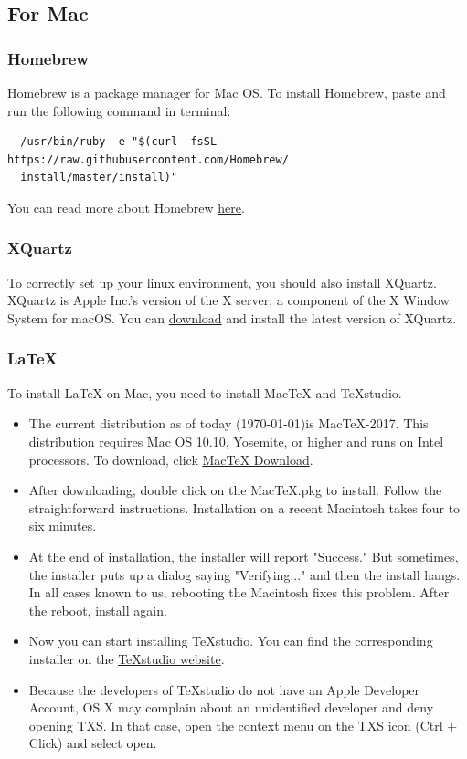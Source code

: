 \documentclass[10pt]{article} %
\begin{document}
\subsection{For Mac}

\subsubsection{Homebrew}

Homebrew is a package manager for Mac OS.
To install Homebrew, paste and run the following command in terminal:
\begin{lstlisting}
  /usr/bin/ruby -e "$(curl -fsSL https://raw.githubusercontent.com/Homebrew/
  install/master/install)"
\end{lstlisting}
You can read more about Homebrew \href{https://brew.sh/}{here}.

\subsubsection{XQuartz}

To correctly set up your linux environment, you should also install XQuartz.
XQuartz is Apple Inc.'s version of the X server, a component of the X Window System for macOS.
You can \href{https://www.xquartz.org/}{download} and install the latest version of XQuartz.

\subsubsection{LaTeX}

To install LaTeX on Mac, you need to install MacTeX and TeXstudio.
\begin{itemize}
  \item The current distribution as of today (\today)is MacTeX-2017.
  This distribution requires Mac OS 10.10, Yosemite, or higher and runs on Intel processors.
  To download, click \href{http://www.tug.org/mactex/mactex-download.html}{MacTeX Download}.
  \item After downloading, double click on the MacTeX.pkg to install.
  Follow the straightforward instructions.
  Installation on a recent Macintosh takes four to six minutes.
  \item At the end of installation, the installer will report "Success." But sometimes, the installer puts up a dialog saying "Verifying..." and then the install hangs.
  In all cases known to us, rebooting the Macintosh fixes this problem.
  After the reboot, install again.
  \item Now you can start installing TeXstudio.
  You can find the corresponding installer on the \href{https://www.texstudio.org/}{TeXstudio website}.
  \item Because the developers of TeXstudio do not have an Apple Developer Account, OS X may complain about an unidentified developer and deny opening TXS.
  In that case, open the context menu on the TXS icon (Ctrl + Click) and select open.
\end{itemize}
\end{document}
